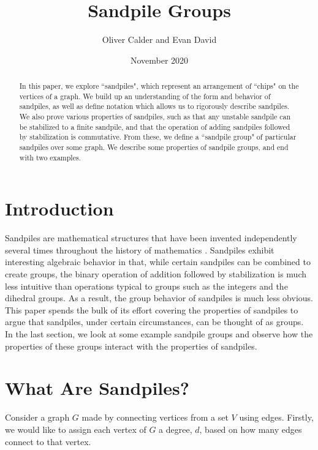 \documentclass[12pt]{article}
\title{Sandpile Groups}
\author{Oliver Calder and Evan David}
\date{November 2020}
\begin{document}
\maketitle

\begin{abstract}
    In this paper, we explore ``sandpiles", which represent an arrangement of ``chips" on the vertices of a graph.  We build up an understanding of the form and behavior of sandpiles, as well as define notation which allows us to rigorously describe sandpiles.  We also prove various properties of sandpiles, such as that any unstable sandpile can be stabilized to a finite sandpile, and that the operation of adding sandpiles followed by stabilization is commutative.  From these, we define a ``sandpile group" of particular sandpiles over some graph.  We describe some properties of sandpile groups, and end with two examples.
\end{abstract}

\section{Introduction}

Sandpiles are mathematical structures that have been invented independently several times throughout the history of mathematics \cite{levine}.  Sandpiles exhibit interesting algebraic behavior in that, while certain sandpiles can be combined to create groups, the binary operation of addition followed by stabilization is much less intuitive than operations typical to groups such as the integers and the dihedral groups.  As a result, the group behavior of sandpiles is much less obvious.  This paper spends the bulk of its effort covering the properties of sandpiles to argue that sandpiles, under certain circumstances, can be thought of as groups.  In the last section, we look at some example sandpile groups and observe how the properties of these groups interact with the properties of sandpiles.

\section{What Are Sandpiles?}

Consider a graph $G$ made by connecting vertices from a set $V$ using edges.  Firstly, we would like to assign each vertex of $G$ a degree, $d$, based on how many edges connect to that vertex.

\end{document}
